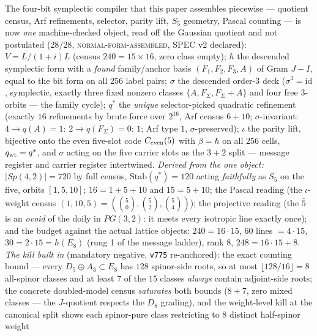 \documentclass[11pt,a4paper]{article}
\theoremstyle{definition}
\begin{document}
\begin{keybox}[The finite compiler normal form $C_{\rm fin}=(V,\hbar,q^{*},\sigma,\iota)$ (2026-08-07) --- one object, the kill built in \mE\ (\veri{v845\_cfin\_normal\_form.py})]
The four-bit symplectic compiler that this paper assembles
piecewise --- quotient census, Arf refinements, selector, parity
lift, $S_5$ geometry, Pascal counting --- is now \emph{one}
machine-checked object, read off the Gaussian quotient and not
postulated ($28/28$, \textsc{normal-form-assembled}, SPEC v2
declared): $V = L/(1{+}i)L$ (census $240 = 15\times16$, zero
class empty); $\hbar$ the descended symplectic form with a
\emph{found} family/anchor basis $(F_1, F_2, F_3, A)$ of Gram
$J - I$, equal to the bit form on all $256$ label pairs;
$\sigma$ the descended order-$3$ deck ($\sigma^3 = \mathrm{id}$,
symplectic, exactly three fixed nonzero classes
$\{A, F_\Sigma, F_\Sigma{+}A\}$ and four free $3$-orbits --- the
family cycle); $q^{*}$ the \emph{unique} selector-picked
quadratic refinement (exactly $16$ refinements by brute force
over $2^{16}$, Arf census $6 + 10$; $\sigma$-invariant: $4 \to
q(A){=}1$: $2 \to q(F_\Sigma){=}0$: $1$; Arf type $1$,
$\sigma$-preserved); $\iota$ the parity lift, bijective onto the
even five-slot code $C_{\rm even}(5)$ with $\beta = \hbar$ on all
$256$ cells, $q_{\rm wt} = q^{*}$, and $\sigma$ acting on the
five carrier slots as the $3{+}2$ split --- message register and
carrier register intertwined.  \emph{Derived from the one
object:} $\lvert Sp(4,2)\rvert = 720$ by full census,
$\mathrm{Stab}(q^{*}) = 120$ acting \emph{faithfully} as $S_5$ on
the five, orbits $[1, 5, 10]$; $16 = 1 + 5 + 10$ and
$15 = 5 + 10$; the Pascal reading (the $\iota$-weight census
$(1, 10, 5) = (\binom50, \binom52, \binom54)$); the projective
reading (the $\bar5$ is an \emph{ovoid} of the doily in
$PG(3,2)$: it meets every isotropic line exactly once); and the
budget against the actual lattice objects: $240 = 16\cdot15$,
$60$ lines $= 4\cdot15$, $30 = 2\cdot15 = h(E_8)$ (rung 1 of the
message ladder), rank $8$, $248 = 16\cdot15 + 8$.  \emph{The kill
built in} (mandatory negative, \texttt{v775} re-anchored): the
exact counting bound --- every $D_5{\oplus}A_3 \subset E_8$ has
$128$ spinor-side roots, so at most $\lfloor128/16\rfloor = 8$
all-spinor classes and at least $7$ of the $15$ classes
\emph{always} contain adjoint-side roots; the concrete
doubled-model census \emph{saturates} both bounds ($8 + 7$, zero
mixed classes --- the $J$-quotient respects the $D_8$ grading),
and the weight-level kill at the canonical split shows each
spinor-pure class restricting to $8$ distinct half-spinor weight

\end{keybox}
\end{document}
